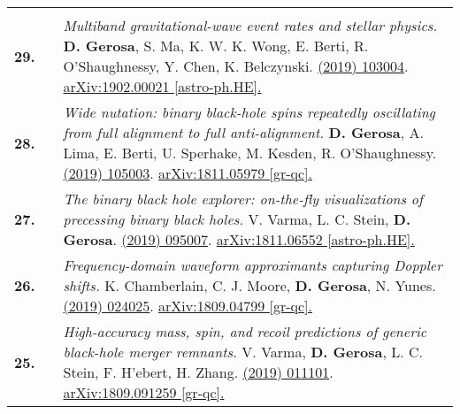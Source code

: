 {\begin{longtable}{rp{0.3cm}p{15.8cm}}
\vspace{0.09cm}\\
%
\textbf{29.} & & \textit{Multiband gravitational-wave event rates and stellar physics.}
\newline{}
\textbf{D. Gerosa}, S. Ma, K. W. K. Wong, E. Berti, R. O'Shaughnessy, Y. Chen, K. Belczynski.
\newline{}
\href{https://journals.aps.org/prd/abstract/10.1103/PhysRevD.99.103004}{\prd 99 (2019) 103004}. \href{https://arxiv.org/abs/1902.00021}{arXiv:1902.00021 [astro-ph.HE].}
\vspace{0.09cm}\\
%
\textbf{28.} & & \textit{Wide nutation: binary black-hole spins repeatedly oscillating from full alignment to full anti-alignment.}
\newline{}
\textbf{D. Gerosa}, A. Lima, E. Berti, U. Sperhake, M. Kesden, R. O'Shaughnessy.
\newline{}
\href{https://iopscience.iop.org/article/10.1088/1361-6382/ab14ae/meta}{\cqg 36 (2019) 105003}. \href{https://arxiv.org/abs/1811.05979}{arXiv:1811.05979 [gr-qc].}
\vspace{0.09cm}\\
%
\textbf{27.} & & \textit{The binary black hole explorer: on-the-fly visualizations of precessing binary black holes.}
\newline{}
V. Varma, L. C. Stein, \textbf{D. Gerosa}.
\newline{}
\href{https://iopscience.iop.org/article/10.1088/1361-6382/ab0ee9/meta}{\cqg 36 (2019) 095007}. \href{https://arxiv.org/abs/1811.06552}{arXiv:1811.06552 [astro-ph.HE].}
\vspace{0.09cm}\\
%
\textbf{26.} & & \textit{Frequency-domain waveform approximants capturing Doppler shifts.}
\newline{}
K. Chamberlain, C. J. Moore, \textbf{D. Gerosa}, N. Yunes.
\newline{}
\href{https://journals.aps.org/prd/abstract/10.1103/PhysRevD.99.024025}{\prd 99 (2019) 024025}. \href{https://arxiv.org/abs/1809.04799}{arXiv:1809.04799 [gr-qc].}
\vspace{0.09cm}\\
%
\textbf{25.} & & \textit{High-accuracy mass, spin, and recoil predictions of generic black-hole merger remnants.}
\newline{}
V. Varma, \textbf{D. Gerosa}, L. C. Stein, F. H'ebert, H. Zhang.
\newline{}
\href{https://journals.aps.org/prl/abstract/10.1103/PhysRevLett.122.011101}{\prl 122 (2019) 011101}. \href{https://arxiv.org/abs/1809.091259}{arXiv:1809.091259 [gr-qc].}

\end{longtable}}
